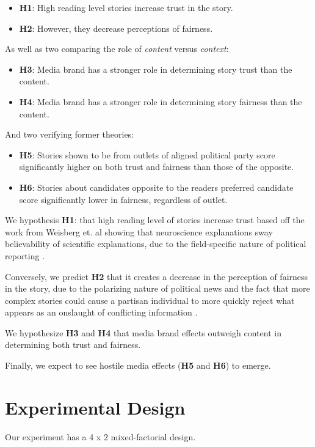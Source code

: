 \begin{itemize}
\item \textbf{H1}: High reading level stories increase trust in the story.
\item \textbf{H2}: However, they decrease perceptions of fairness. 
\end{itemize}

As well as two comparing the role of \emph{content} versus \emph{context}:

\begin{itemize}
\item \textbf{H3}: Media brand has a stronger role in determining story trust than the content. 
\item \textbf{H4}: Media brand has a stronger role in determining story fairness than the content.
\end{itemize}

And two verifying former theories:
\begin{itemize}
\item \textbf{H5}: Stories shown to be from outlets of aligned political party score significantly higher on both trust and fairness than those of the opposite.
\item \textbf{H6}: Stories about candidates opposite to the readers preferred candidate score significantly lower in fairness, regardless of outlet.
\end{itemize}

We hypothesis \textbf{H1}: that high reading level of stories increase trust based off the work from Weisberg et. al showing that neuroscience explanations sway believability of scientific explanations, due to the field-specific nature of political reporting \cite{weisberg2008seductive}.

Conversely, we predict \textbf{H2} that it creates a decrease in the perception of fairness in the story, due to the polarizing nature of political news and the fact that more complex stories could cause a partisan individual to more quickly reject what appears as an onslaught of conflicting information \cite{cacioppo1979effects}.
 
 We hypothesize \textbf{H3} and \textbf{H4} that media brand effects outweigh content in determining both trust and fairness.

 Finally, we expect to see hostile media effects (\textbf{H5} and \textbf{H6}) to emerge.

\section{Experimental Design}
Our experiment has a 4 x 2 mixed-factorial design.

